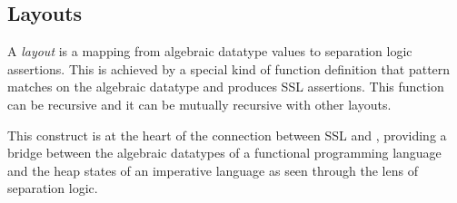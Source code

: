 \subsection{Layouts}
\label{sec:layouts}

A \textit{layout} is a mapping from algebraic datatype values to separation logic assertions. This is achieved by a special kind of function definition that pattern matches on the algebraic datatype and produces SSL assertions. This function can be recursive and it can be mutually recursive with other layouts.

This construct is at the heart of the connection between SSL and \Pika, providing a bridge between the algebraic datatypes of a functional programming language and the heap states of an imperative language as seen through the lens of separation logic.

